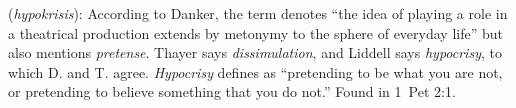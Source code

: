 \item[Hypocrisy,]

(\textit{hypokrisis}):
According to Danker, the term denotes ``the idea of playing a role in a theatrical production extends by metonymy to the sphere of everyday life'' but also mentions \emph{pretense}. Thayer says \emph{dissimulation}, and Liddell says \emph{hypocrisy}, to which D. and T. agree. \emph{Hypocrisy} defines as ``pretending to be what you are not, or pretending to believe something that you do not.''
Found in 1~Pet 2:1.
